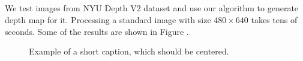 \documentclass[10pt,twocolumn,letterpaper]{article}
\begin{document}
\subsection{}
We test images from NYU Depth V2 dataset and use our algorithm to generate depth map for it. Processing a standard image with size $480 \times 640$ takes tens of seconds. Some of the results are shown in Figure .

\begin{figure}
\begin{center}
\end{center}
   \caption{Example of a short caption, which should be centered.}
\label{fig:short}
\end{figure}


{\small


}
\end{document}
